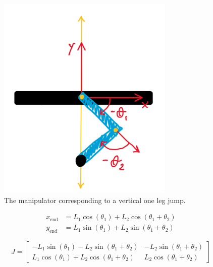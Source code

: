 \begin{figure}[h]
    \centering
    \includegraphics[width=0.75\textwidth]{Images/vertical_manipulator.png}
    \caption{The manipulator corresponding to a vertical one leg jump.}
    \label{fig:vertical_manipulator}
\end{figure}

\begin{equation}
    \label{eq:2_link_manipulator}
    \begin{aligned}
        x_{\text{end}} &= L_1 \cos(\theta_1) + L_2 \cos(\theta_1 + \theta_2) \\
        y_{\text{end}} &= L_1 \sin(\theta_1) + L_2 \sin(\theta_1 + \theta_2)
    \end{aligned}
\end{equation}

\begin{equation*}
    \label{eq:jacobian_vertical_jump_leg}
    J = \begin{bmatrix} 
    -L_1 \sin(\theta_1) - L_2 \sin(\theta_1 + \theta_2) & -L_2 \sin(\theta_1 + \theta_2) \\
    L_1 \cos(\theta_1) + L_2 \cos(\theta_1 + \theta_2) & L_2 \cos(\theta_1 + \theta_2)
    \end{bmatrix}
\end{equation*}

